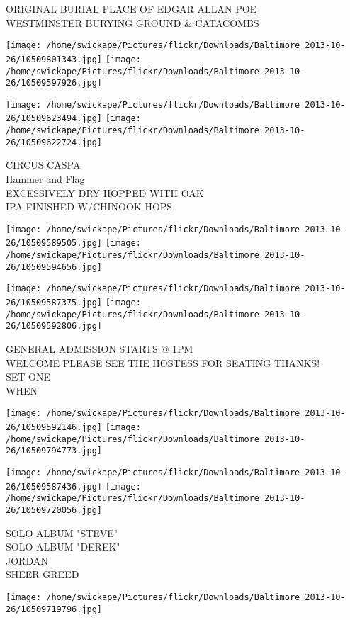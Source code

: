 \documentclass[10pt,letterpaper]{article}
\begin{document}
ORIGINAL BURIAL PLACE OF EDGAR ALLAN POE\\
WESTMINSTER BURYING GROUND \& CATACOMBS
\pagebreak

\texttt{[image: /home/swickape/Pictures/flickr/Downloads/Baltimore 2013-10-26/10509801343.jpg]}
\texttt{[image: /home/swickape/Pictures/flickr/Downloads/Baltimore 2013-10-26/10509597926.jpg]}

\texttt{[image: /home/swickape/Pictures/flickr/Downloads/Baltimore 2013-10-26/10509623494.jpg]}
\texttt{[image: /home/swickape/Pictures/flickr/Downloads/Baltimore 2013-10-26/10509622724.jpg]}

CIRCUS CASPA\\
Hammer and Flag\\
EXCESSIVELY DRY HOPPED WITH OAK\\
IPA FINISHED W/CHINOOK HOPS
\pagebreak

\texttt{[image: /home/swickape/Pictures/flickr/Downloads/Baltimore 2013-10-26/10509589505.jpg]}
\texttt{[image: /home/swickape/Pictures/flickr/Downloads/Baltimore 2013-10-26/10509594656.jpg]}

\texttt{[image: /home/swickape/Pictures/flickr/Downloads/Baltimore 2013-10-26/10509587375.jpg]}
\texttt{[image: /home/swickape/Pictures/flickr/Downloads/Baltimore 2013-10-26/10509592806.jpg]}

GENERAL ADMISSION STARTS @ 1PM\\
WELCOME PLEASE SEE THE HOSTESS FOR SEATING THANKS!\\
SET ONE\\
WHEN
\pagebreak

\texttt{[image: /home/swickape/Pictures/flickr/Downloads/Baltimore 2013-10-26/10509592146.jpg]}
\texttt{[image: /home/swickape/Pictures/flickr/Downloads/Baltimore 2013-10-26/10509794773.jpg]}

\texttt{[image: /home/swickape/Pictures/flickr/Downloads/Baltimore 2013-10-26/10509587436.jpg]}
\texttt{[image: /home/swickape/Pictures/flickr/Downloads/Baltimore 2013-10-26/10509720056.jpg]}

SOLO ALBUM "STEVE"\\
SOLO ALBUM "DEREK"\\
JORDAN\\
SHEER GREED
\pagebreak

\texttt{[image: /home/swickape/Pictures/flickr/Downloads/Baltimore 2013-10-26/10509719796.jpg]}
\end{document}
